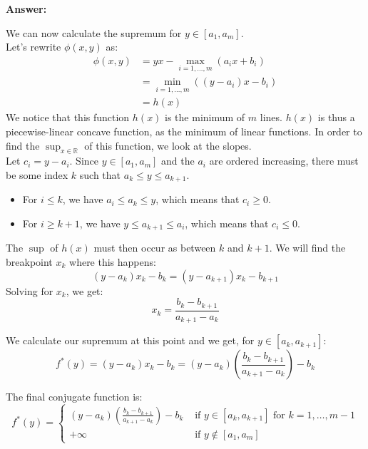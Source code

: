 \documentclass[11pt,a4paper]{article}
\newenvironment{solution}{
  \par\noindent\textbf{Answer:}\vspace{0.3em}
}{\vspace{1em}}
\begin{document}
\begin{enumerate}
\begin{solution}
        We can now calculate the supremum for $y \in [a_1, a_m]$.\\
        Let's rewrite $\phi(x, y)$ as:
        \begin{align*}
            \phi(x, y)
            &= y x - \max_{i=1,\dots,m} (a_i x + b_i)\\
            &= \min_{i=1,\dots,m} \left( (y - a_i) x - b_i \right)\\
            &= h(x)
        \end{align*}
        We notice that this function $h(x)$ is the minimum of $m$ lines. $h(x)$ is thus a piecewise-linear concave function, as the minimum of linear functions. In order to find the $\sup_{x \in \mathbb{R}}$ of this function, we look at the slopes.\\
        Let $c_i = y - a_i$. Since $y \in [a_1, a_m]$ and the $a_i$ are ordered increasing, there must be some index $k$ such that $a_k \leq y \leq a_{k+1}$.\\
        \begin{itemize}
            \item For $i \leq k$, we have $a_i \leq a_k \leq y$, which means that $c_i \geq 0$.
            \item For $i \geq k + 1$, we have $y \leq a_{k+1} \leq a_i$, which means that $c_i \leq 0$.
        \end{itemize}
        The $\sup$ of $h(x)$ must then occur as between $k$ and $k+1$. We will find the breakpoint $x_k$ where this happens:
        \[
            (y - a_k) x_k - b_k = (y - a_{k+1}) x_k - b_{k+1}
        \]
        Solving for $x_k$, we get:
        \[
            x_k = \frac{b_k - b_{k+1}}{a_{k+1} - a_k}
        \]

        We calculate our supremum at this point and we get, for $y \in [a_k, a_{k+1}]$:
        \[
            f^*(y) = (y - a_k) x_k - b_k = (y - a_k) \left( \frac{b_k - b_{k+1}}{a_{k+1} - a_k} \right) - b_k
        \]
        
        The final conjugate function is:
        \[
            f^* (y) = \begin{cases}
                (y - a_k) \left( \frac{b_k - b_{k+1}}{a_{k+1} - a_k} \right) - b_k &\text{ if } y \in [a_k, a_{k+1}] \text{ for } k=1, \dots, m-1\\
                +\infty &\text{ if } y \notin [a_1, a_m] 
            \end{cases}
        \]
    \end{solution}
\end{enumerate}
\end{document}
